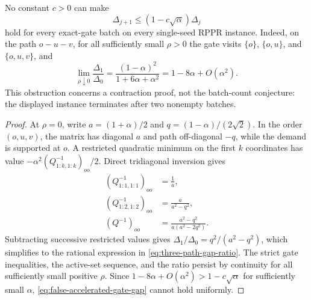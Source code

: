 \begin{proposition}
\label{prop:three-path-gap-obstruction}
No constant $c>0$ can make
\begin{equation}
 \Delta_{j+1}\leq(1-c\sqrt\alpha)\Delta_j
 \label{eq:false-accelerated-gate-gap}
\end{equation}
hold for every exact-gate batch on every single-seed RPPR instance.  Indeed,
on the path $o-u-v$, for all sufficiently small $\rho>0$ the gate visits
$\{o\}$, $\{o,u\}$, and $\{o,u,v\}$, and
\begin{equation}
 \lim_{\rho\downarrow0}\frac{\Delta_1}{\Delta_0}
 =\frac{(1-\alpha)^2}{1+6\alpha+\alpha^2}
 =1-8\alpha+O(\alpha^2).
 \label{eq:three-path-gap-ratio}
\end{equation}
This obstruction concerns a contraction proof, not the batch-count
conjecture: the displayed instance terminates after two nonempty batches.
\end{proposition}

\begin{proof}
At $\rho=0$, write
$a=(1+\alpha)/2$ and $q=(1-\alpha)/(2\sqrt2)$.  In the order $(o,u,v)$,
the matrix has diagonal $a$ and path off-diagonal $-q$, while the demand is
supported at $o$.  A restricted quadratic minimum on the first $k$
coordinates has value
$-\alpha^2(Q_{1:k,1:k}^{-1})_{oo}/2$.  Direct tridiagonal inversion gives
\begin{align*}
 (Q_{1:1,1:1}^{-1})_{oo}&=\frac1a,\\
 (Q_{1:2,1:2}^{-1})_{oo}&=\frac{a}{a^2-q^2},\\
 (Q^{-1})_{oo}&=\frac{a^2-q^2}{a(a^2-2q^2)}.
\end{align*}
Subtracting successive restricted values gives
$\Delta_1/\Delta_0=q^2/(a^2-q^2)$, which simplifies to the rational
expression in \cref{eq:three-path-gap-ratio}.  The strict gate inequalities,
the active-set sequence, and the ratio persist by continuity for all
sufficiently small positive $\rho$.  Since
$1-8\alpha+O(\alpha^2)>1-c\sqrt\alpha$ for sufficiently small $\alpha$,
\cref{eq:false-accelerated-gate-gap} cannot hold uniformly.
\end{proof}

